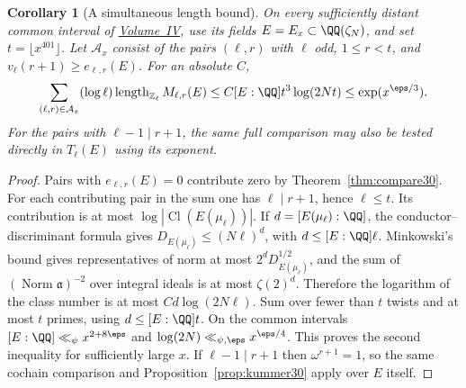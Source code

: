 \documentclass[a4paper,11pt]{article}
\newtheorem{corollary}[proposition]{Corollary}
\theoremstyle{definition}
\theoremstyle{remark}
\newcommand{\ZZ}{\mathbb Z}\newcommand{\ord}{\operatorname{ord}}
\newcommand{\len}{\operatorname{length}}\newcommand{\Res}{\operatorname*{Res}}
\numberwithin{equation}{section}
\newcommand{\Cl}{\operatorname{Cl}}
\begin{document}
\begin{corollary}[A simultaneous length bound]\label{cor:family30}
On every sufficiently distant common interval of \hyperref[nav:volume-IV]{Volume~IV}, use its fields \(E=E_x\subset\QQ(\zeta_N)\), and set \(t=\lfloor x^{401}\rfloor\). Let \(\mathcal A_x\) consist of the pairs \((\ell,r)\) with \(\ell\) odd, \(1\le r<t\), and \(v_\ell(r+1)\ge e_{\ell,r}(E)\). For an absolute \(C\),
\begin{equation}
 \sum_{(\ell,r)\in\mathcal A_x}(\log\ell)\len_{\ZZ_\ell}M_{\ell,r}(E)
   \le C[E:\QQ]t^3\log(2Nt)\le \exp(x^{\eps/3}).              \label{eq:family30}
\end{equation}
For the pairs with \(\ell-1\mid r+1\), the same full comparison may also be tested directly in \(T_\ell(E)\) using its exponent.
\end{corollary}
\begin{proof}
Pairs with \(e_{\ell,r}(E)=0\) contribute zero by Theorem~\ref{thm:compare30}. For each contributing pair in the sum one has \(\ell\mid r+1\), hence \(\ell\le t\). Its contribution is at most \(\log|\Cl(E(\mu_\ell))|\). If \(d=[E(\mu_\ell):\QQ]\), the conductor--discriminant formula gives \(D_{E(\mu_\ell)}\le (N\ell)^d\), with \(d\le[E:\QQ]\ell\). Minkowski's bound gives representatives of norm at most \(2^dD_{E(\mu_\ell)}^{1/2}\), and the sum of \((\operatorname{Norm}\mathfrak a)^{-2}\) over integral ideals is at most \(\zeta(2)^d\). Therefore the logarithm of the class number is at most \(Cd\log(2N\ell)\). Sum over fewer than \(t\) twists and at most \(t\) primes, using \(d\le[E:\QQ]t\). On the common intervals \([E:\QQ]\ll_\psi x^{2+8\eps}\) and \(\log(2N)\ll_{\psi,\eps} x^{\eps/4}\). This proves the second inequality for sufficiently large \(x\). If \(\ell-1\mid r+1\) then \(\omega^{r+1}=1\), so the same cochain comparison and Proposition~\ref{prop:kummer30} apply over \(E\) itself.
\end{proof}
\end{document}
